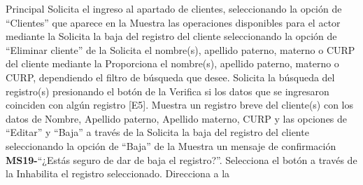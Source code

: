 	\begin{UCtrayectoria}{Principal}
		\UCpaso[\UCactor] Solicita el ingreso al apartado de clientes, seleccionando la opción de ``Clientes'' que aparece en la 
		\UCpaso Muestra las operaciones disponibles para el actor mediante la 
		\UCpaso[\UCactor] Solicita la baja del registro del cliente seleccionando la opción de ``Eliminar cliente'' de la 
		\UCpaso Solicita el nombre(s), apellido paterno, materno o CURP del cliente mediante la 
		\UCpaso[\UCactor] Proporciona el nombre(s), apellido paterno, materno o CURP, dependiendo el filtro de búsqueda que desee.
		\UCpaso[\UCactor] Solicita la búsqueda del registro(s) presionando el botón  de la 
		\UCpaso Verifica si los datos que se ingresaron coinciden con algún registro [E5].
		\UCpaso Muestra un registro breve del cliente(s) con los datos de Nombre, Apellido paterno, Apellido materno, CURP y las opciones de ``Editar'' y ``Baja'' a través de la 
		\UCpaso[\UCactor] Solicita la baja del registro del cliente seleccionando la opción de ``Baja'' de la   
		\UCpaso Muestra un mensaje de confirmación {\bf MS19-}``¿Estás seguro de dar de baja el registro?''.
		\UCpaso[\UCactor] Selecciona el botón  a través de la 
		\UCpaso Inhabilita el registro seleccionado.
		\UCpaso Direcciona a la 
	\end{UCtrayectoria}
	
